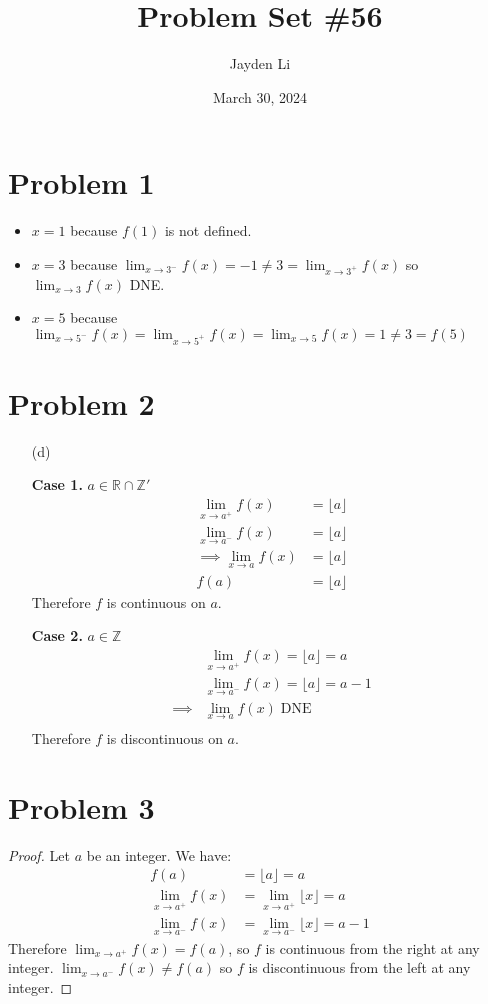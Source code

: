 \documentclass{article}
\title{Problem Set \#56}
\author{Jayden Li}
\date{March 30, 2024}
\newcommand*{\problem}[1]{\section*{Problem #1}}
\newcommand*{\limit}[2][x]{\ensuremath{\displaystyle\lim_{#1\to#2}}}
\newcommand*{\floor}[1]{\ensuremath{\lfloor #1\rfloor}}
\DeclareMathOperator{\DNE}{DNE}
\begin{document}
\fontsize{12pt}{12pt}\selectfont
\setlength{\abovedisplayskip}{0pt}
\maketitle

\problem{1}
\begin{itemize}
	\item $x=1$ because $f(1)$ is not defined.
	\item $x=3$ because $\limit{3^-}f(x)=-1\neq3=\limit{3^+}f(x)$ so $\limit{3}f(x)$ DNE.
	\item $x=5$ because $\limit{5^-}f(x)=\limit{5^+}f(x)=\limit{5}f(x)=1\neq3=f(5)$
\end{itemize}

\problem{2}
\begin{itemize}
	\item[(d)]
	\begin{minipage}[t]{0.49\linewidth}
		\textbf{Case 1.} $a\in\mathbb{R}\cap\mathbb{Z}'$
		\begin{align*}
			\limit{a^+}f(x)&=\floor{a} \\
			\limit{a^-}f(x)&=\floor{a} \\
			\implies\limit{a}f(x)&=\floor{a} \\
			f(a)&=\floor{a}
		\end{align*}
		Therefore $f$ is continuous on $a$.
	\end{minipage}
	\begin{minipage}[t]{0.49\linewidth}
		\textbf{Case 2.} $a\in\mathbb{Z}$
		\begin{align*}
			&\limit{a^+}f(x)=\floor{a}=a \\
			&\limit{a^-}f(x)=\floor{a}=a-1 \\
			\implies&\limit{a}f(x)\DNE \\
		\end{align*}
		Therefore $f$ is discontinuous on $a$.
	\end{minipage}

\end{itemize}

\problem{3}
\begin{proof}
	Let $a$ be an integer. We have:
	\begin{align*}
		f(a)&=\floor{a}=a \\
		\limit{a^+}f(x)&=\limit{a^+}\floor{x}=a \\
		\limit{a^-}f(x)&=\limit{a^-}\floor{x}=a-1
	\end{align*}
	Therefore $\limit{a^+}f(x)=f(a)$, so $f$ is continuous from the right at any integer. $\limit{a^-}f(x)\neq f(a)$ so $f$ is discontinuous from the left at any integer.
\end{proof}
\end{document}
